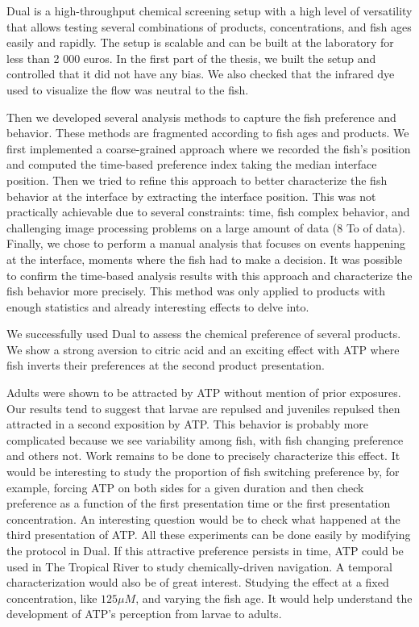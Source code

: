   Dual is a high-throughput chemical screening setup with a high level of versatility that allows testing several combinations of products, concentrations, and fish ages easily and rapidly. The setup is scalable and can be built at the laboratory for less than 2 000 euros. In the first part of the thesis, we built the setup and controlled that it did not have any bias. We also checked that the infrared dye used to visualize the flow was neutral to the fish.

  Then we developed several analysis methods to capture the fish preference and behavior. These methods are fragmented according to fish ages and products. We first implemented a coarse-grained approach where we recorded the fish's position and computed the time-based preference index taking the median interface position. Then we tried to refine this approach to better characterize the fish behavior at the interface by extracting the interface position. This was not practically achievable due to several constraints: time, fish complex behavior, and challenging image processing problems on a large amount of data (8 To of data). Finally, we chose to perform a manual analysis that focuses on events happening at the interface, moments where the fish had to make a decision. It was possible to confirm the time-based analysis results with this approach and characterize the fish behavior more precisely. This method was only applied to products with enough statistics and already interesting effects to delve into.

  We successfully used Dual to assess the chemical preference of several products. We show a strong aversion to citric acid and an exciting effect with ATP where fish inverts their preferences at the second product presentation.

  Adults were shown to be attracted by ATP without mention of prior exposures. Our results tend to suggest that larvae are repulsed and juveniles repulsed then attracted in a second exposition by ATP. This behavior is probably more complicated because we see variability among fish, with fish changing preference and others not. Work remains to be done to precisely characterize this effect. It would be interesting to study the proportion of fish switching preference by, for example, forcing ATP on both sides for a given duration and then check preference as a function of the first presentation time or the first presentation concentration. An interesting question would be to check what happened at the third presentation of ATP. All these experiments can be done easily by modifying the protocol in Dual. If this attractive preference persists in time, ATP could be used in The Tropical River to study chemically-driven navigation. A temporal characterization would also be of great interest. Studying the effect at a fixed concentration, like $125 \mu M$, and varying the fish age. It would help understand the development of ATP's perception from larvae to adults.

